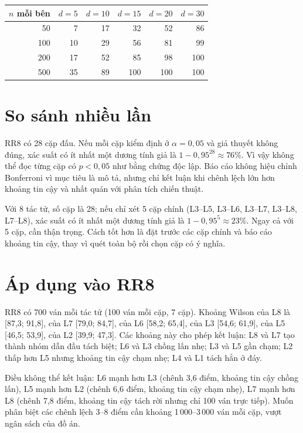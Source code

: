 \begin{center}\small

\begin{tabular}{@{}rrrrrr@{}}

\toprule

$n$ mỗi bên & $d=5$ & $d=10$ & $d=15$ & $d=20$ & $d=30$ \\

\midrule

50 & 7 & 17 & 32 & 52 & 86 \\

100 & 10 & 29 & 56 & 81 & 99 \\

200 & 17 & 52 & 85 & 98 & 100 \\

500 & 35 & 89 & 100 & 100 & 100 \\

\bottomrule

\end{tabular}

\end{center}

\section{So sánh nhiều lần}

RR8 có 28 cặp đấu. Nếu mỗi cặp kiểm định ở $\alpha=0{,}05$ và giả thuyết không đúng, xác suất có ít nhất một dương tính giả là $1-0{,}95^{28}\approx 76\%$. Vì vậy không thể đọc từng cặp có $p<0{,}05$ như bằng chứng độc lập. Báo cáo không hiệu chỉnh Bonferroni vì mục tiêu là mô tả, nhưng chỉ kết luận khi chênh lệch lớn hơn khoảng tin cậy và nhất quán với phân tích chiến thuật.

Với 8 tác tử, số cặp là 28; nếu chỉ xét 5 cặp chính (L3--L5, L3--L6, L3--L7, L3--L8, L7--L8), xác suất có ít nhất một dương tính giả là $1-0{,}95^5\approx 23\%$. Ngay cả với 5 cặp, cần thận trọng. Cách tốt hơn là đặt trước các cặp chính và báo cáo khoảng tin cậy, thay vì quét toàn bộ rồi chọn cặp có ý nghĩa.

\section{Áp dụng vào RR8}

RR8 có 700 ván mỗi tác tử (100 ván mỗi cặp, 7 cặp). Khoảng Wilson của L8 là [87,3; 91,8], của L7 [79,0; 84,7], của L6 [58,2; 65,4], của L3 [54,6; 61,9], của L5 [46,5; 53,9], của L2 [39,9; 47,3]. Các khoảng này cho phép kết luận: L8 và L7 tạo thành nhóm dẫn đầu tách biệt; L6 và L3 chồng lấn nhẹ; L3 và L5 gần chạm; L2 thấp hơn L5 nhưng khoảng tin cậy chạm nhẹ; L4 và L1 tách hẳn ở đáy.

Điều không thể kết luận: L6 mạnh hơn L3 (chênh 3,6 điểm, khoảng tin cậy chồng lấn), L5 mạnh hơn L2 (chênh 6,6 điểm, khoảng tin cậy chạm nhẹ), L7 mạnh hơn L8 (chênh 7,8 điểm, khoảng tin cậy tách rời nhưng chỉ 100 ván trực tiếp). Muốn phân biệt các chênh lệch 3--8 điểm cần khoảng 1\,000--3\,000 ván mỗi cặp, vượt ngân sách của đồ án.